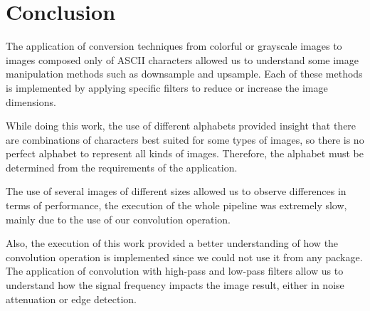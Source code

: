 \documentclass[]{IEEEtran}
\begin{document}
\section{Conclusion}
 
The application of conversion techniques from colorful or grayscale images to images composed only of ASCII characters allowed us to understand some image manipulation methods such as downsample and upsample. Each of these methods is implemented by applying specific filters to reduce or increase the image dimensions.

While doing this work, the use of different alphabets provided insight that there are combinations of characters best suited for some types of images, so there is no perfect alphabet to represent all kinds of images. Therefore, the alphabet must be determined from the requirements of the application.

The use of several images of different sizes allowed us to observe differences in terms of performance, the execution of the whole pipeline was extremely slow, mainly due to the use of our convolution operation.
 
Also, the execution of this work provided a better understanding of how the convolution operation is implemented since we could not use it from any package. The application of convolution with high-pass and low-pass filters allow us to understand how the signal frequency impacts the image result, either in noise attenuation or edge detection.

  
\end{document}
